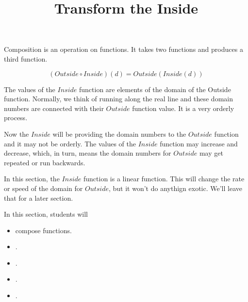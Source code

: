 \documentclass{ximera}
\title{Transform the Inside}
\begin{document}
\begin{abstract}
\end{abstract}
\maketitle






Composition is an operation on functions.  It takes two functions and produces a third function.


\[  (Outside \circ Inside)(d) = Outside(Inside(d))    \]


The values of the $Inside$ function are elements of the domain of the Outside function. Normally, we think of running along the real line and these domain numbers are connected with their $Outside$ function value.  It is a very orderly process.

Now the $Inside$ will be providing the domain numbers to the $Outside$ function and it may not be orderly. The values of the $Inside$ function may increase and decrease, which, in turn, means the domain numbers for $Outside$ may get repeated or run backwards.

In this section, the $Inside$ function is a linear function.  This will change the rate or speed of the domain for $Outside$, but it won't do anythign exotic.  We'll leave that for a later section.










\begin{sectionOutcomes}
In this section, students will 

\begin{itemize}
\item compose functions.
\item .
\item .
\item .
\item .
\end{itemize}
\end{sectionOutcomes}
\end{document}
